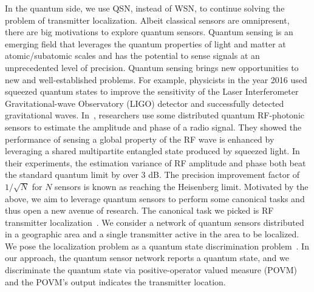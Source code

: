 In the quantum side, we use QSN, instead of WSN, to continue solving the problem of transmitter localization.
Albeit classical sensors are omnipresent, there are big motivations to explore quantum sensors.
Quantum sensing is an emerging field that leverages the quantum properties of light and matter at atomic/subatomic scales and has the potential to sense signals at an unprecedented level of precision.
Quantum sensing brings new opportunities to new and well-established problems.
For example, physicists in the year 2016 used squeezed quantum states to improve the sensitivity of the Laser Interferometer Gravitational-wave Observatory (LIGO) detector and successfully detected gravitational waves.
In~\cite{PRL20-qsn}, researchers use some distributed quantum RF-photonic sensors to estimate the amplitude and phase of a radio signal.
They showed the performance of sensing a global property of the RF wave is enhanced by leveraging a shared multipartite entangled state produced by squeezed light.
In their experiments, the estimation variance of RF amplitude and phase both beat the standard quantum limit by over 3 dB.
The precision improvement factor of $1/\sqrt{N}$ for $N$ sensors is known as reaching the Heisenberg limit.
Motivated by the above, we aim to leverage quantum sensors to perform some canonical tasks and thus open a new avenue of research.
The canonical task we picked is RF transmitter localization~\cite{nsdi13-arraytrack,pmc22-deepmtlpro}.
We consider a network of quantum sensors distributed in a geographic area and a single transmitter active in the area to be localized.
We pose the localization problem as a quantum state discrimination problem~\cite{bergou-review-2007}. 
In our approach, the quantum sensor network reports a quantum state, and we discriminate the quantum state via 
positive-operator valued measure (POVM) and the POVM's output indicates the transmitter location.

